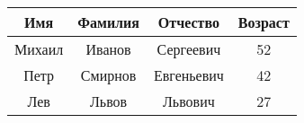 \documentclass{article}
\begin{document}
\begin{table}[h]
\centering
\begin{tabular}{|c|c|c|c|}\hline
Имя & Фамилия & Отчество & Возраст \\
\hline
Михаил & Иванов & Сергеевич & 52 \\
\hline
Петр & Смирнов & Евгеньевич & 42 \\
\hline
Лев & Львов & Львович & 27 \\
\hline
\end{tabular}
\end{table}
\end{document}
